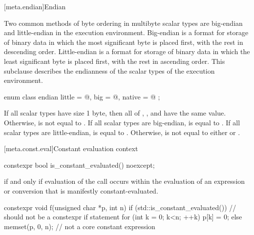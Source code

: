 [meta.endian]{Endian}

\pnum
Two common methods of byte ordering in multibyte scalar types are big-endian
and little-endian in the execution environment. Big-endian is a format for
storage of binary data in which the most significant byte is placed first,
with the rest in descending order. Little-endian is a format for storage of
binary data in which the least significant byte is placed first, with the rest
in ascending order. This subclause describes the endianness of the scalar types
of the execution environment.

%
%
%
%
\begin{itemdecl}
enum class endian {
  little = @\seebelow@,
  big    = @\seebelow@,
  native = @\seebelow@
};
\end{itemdecl}

\begin{itemdescr}
\pnum
If all scalar types have size 1 byte, then all of ,
, and  have the same value.
Otherwise,  is not equal to .
If all scalar types are big-endian,  is
equal to .
If all scalar types are little-endian,  is
equal to .
Otherwise,  is not equal
to either  or .
\end{itemdescr}

[meta.const.eval]{Constant evaluation context}
\begin{itemdecl}
constexpr bool is_constant_evaluated() noexcept;
\end{itemdecl}

\begin{itemdescr}
\pnum
\returns {} if and only if evaluation of the call occurs
within the evaluation of an expression or conversion
that is manifestly constant-evaluated.

\pnum
\begin{example}
\begin{codeblock}
constexpr void f(unsigned char *p, int n) {
  if (std::is_constant_evaluated()) {           // should not be a constexpr if statement
    for (int k = 0; k<n; ++k) p[k] = 0;
  } else {
    memset(p, 0, n);                            // not a core constant expression
  }
}
\end{codeblock}
\end{example}
\end{itemdescr}

